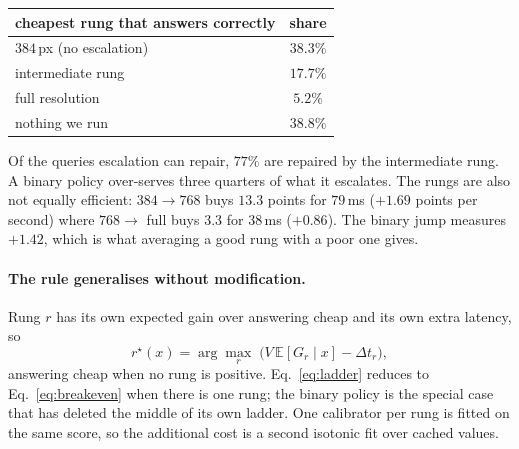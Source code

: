\documentclass[10pt,twocolumn]{article}
\theoremstyle{plain}
\begin{document}
\begin{center}\small
\begin{tabular}{lc}
\toprule
cheapest rung that answers correctly & share \\
\midrule
$384$\,px (no escalation) & $38.3\%$ \\
intermediate rung & $\mathbf{17.7\%}$ \\
full resolution & $5.2\%$ \\
nothing we run & $38.8\%$ \\
\bottomrule
\end{tabular}
\end{center}

\noindent Of the queries escalation can repair, $77\%$ are repaired by the
intermediate rung. A binary policy over-serves three quarters of what it
escalates. The rungs are also not equally efficient: $384 \to 768$ buys $13.3$
points for $79$\,ms ($+1.69$ points per second) where $768 \to$ full buys $3.3$
for $38$\,ms ($+0.86$). The binary jump measures $+1.42$, which is what
averaging a good rung with a poor one gives.

\paragraph{The rule generalises without modification.} Rung $r$ has its own
expected gain over answering cheap and its own extra latency, so
\begin{equation}
r^\star(x) = \arg\max_r \;\bigl(V\,\mathbb{E}[G_r \mid x] - \Delta t_r\bigr),
\label{eq:ladder}
\end{equation}
answering cheap when no rung is positive. Eq.~\ref{eq:ladder} reduces to
Eq.~\ref{eq:breakeven} when there is one rung; the binary policy is the special
case that has deleted the middle of its own ladder. One calibrator per rung is
fitted on the same score, so the additional cost is a second isotonic fit over
cached values.
\end{document}
